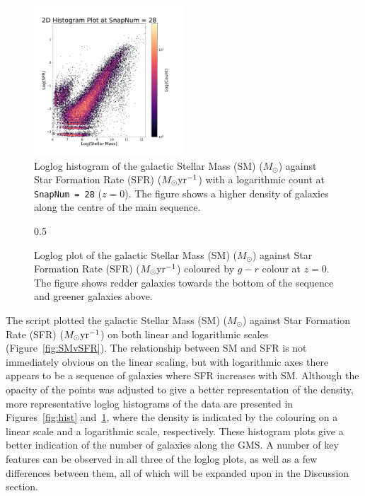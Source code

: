 \documentclass[12pt]{article}
\begin{document}
\begin{figure}[htbp]
  \centerline{\includegraphics[width=0.5\textwidth]{histlog.pdf}}
    \caption{Loglog histogram of the galactic Stellar Mass (SM) ($M_\odot$) against Star Formation Rate (SFR) ($M_\odot\rm{yr}^{-1}$) with a logarithmic count at {\tt SnapNum = 28} ($z=0$).  The figure shows a higher density of galaxies along the centre of the main sequence.}
    \label{fig:histlog}
\end{figure}

\begin{figure}{0.5\textwidth}
    \caption{Loglog plot of the galactic Stellar Mass (SM) ($M_\odot$) against Star Formation Rate (SFR) ($M_\odot\rm{yr}^{-1}$) coloured by $g-r$ colour at $z=0$.  The figure shows redder galaxies towards the bottom of the sequence and greener galaxies above.}
    \label{fig:colour}
\end{figure}


The script plotted the galactic Stellar Mass (SM) ($M_\odot$) against Star Formation Rate (SFR) ($M_\odot\rm{yr}^{-1}$) on both linear and logarithmic scales (Figure~\ref{fig:SMvSFR}).  The relationship between SM and SFR is not immediately obvious on the linear scaling, but with logarithmic axes there appears to be a sequence of galaxies where SFR increases with SM.  Although the opacity of the points was adjusted to give a better representation of the density, more representative loglog histograms of the data are presented in Figures~\ref{fig:hist} and~\ref{fig:histlog}, where the density is indicated by the colouring on a linear scale and a logarithmic scale, respectively.  These histogram plots give a better indication of the number of galaxies along the GMS.  A number of key features can be observed in all three of the loglog plots, as well as a few differences between them, all of which will be expanded upon in the Discussion section.    
\end{document}
